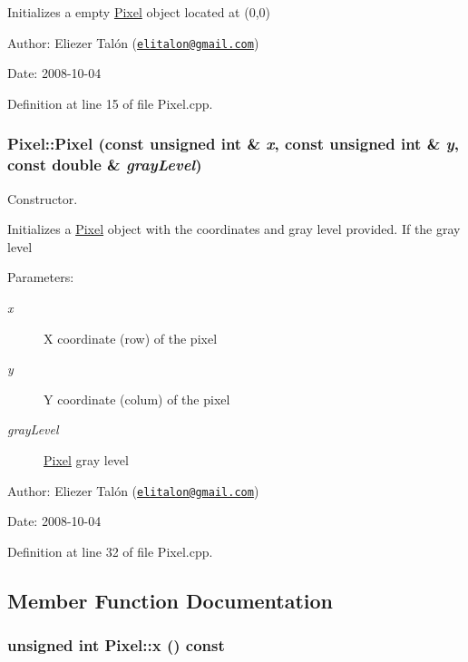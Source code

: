 Initializes a empty \hyperlink{class_pixel}{Pixel} object located at (0,0)

\begin{Desc}
\item[Author:]Eliezer Talón (\href{mailto:elitalon@gmail.com}{\tt elitalon@gmail.com}) \end{Desc}
\begin{Desc}
\item[Date:]2008-10-04 \end{Desc}


Definition at line 15 of file Pixel.cpp.\hypertarget{class_pixel_e54d95bf19847e4857eeb03f1138ceb9}{
\subsubsection[Pixel]{\setlength{\rightskip}{0pt plus 5cm}Pixel::Pixel (const unsigned int \& {\em x}, \/  const unsigned int \& {\em y}, \/  const double \& {\em grayLevel})}}
\label{class_pixel_e54d95bf19847e4857eeb03f1138ceb9}


Constructor. 

Initializes a \hyperlink{class_pixel}{Pixel} object with the coordinates and gray level provided. If the gray level

\begin{Desc}
\item[Parameters:]
\begin{description}
\item[{\em x}]X coordinate (row) of the pixel \item[{\em y}]Y coordinate (colum) of the pixel \item[{\em grayLevel}]\hyperlink{class_pixel}{Pixel} gray level\end{description}
\end{Desc}
\begin{Desc}
\item[Author:]Eliezer Talón (\href{mailto:elitalon@gmail.com}{\tt elitalon@gmail.com}) \end{Desc}
\begin{Desc}
\item[Date:]2008-10-04 \end{Desc}


Definition at line 32 of file Pixel.cpp.

\subsection{Member Function Documentation}
\hypertarget{class_pixel_68dafccc4588fb33d445641c2766316b}{
\subsubsection[x]{\setlength{\rightskip}{0pt plus 5cm}unsigned int Pixel::x () const}}
\label{class_pixel_68dafccc4588fb33d445641c2766316b}


